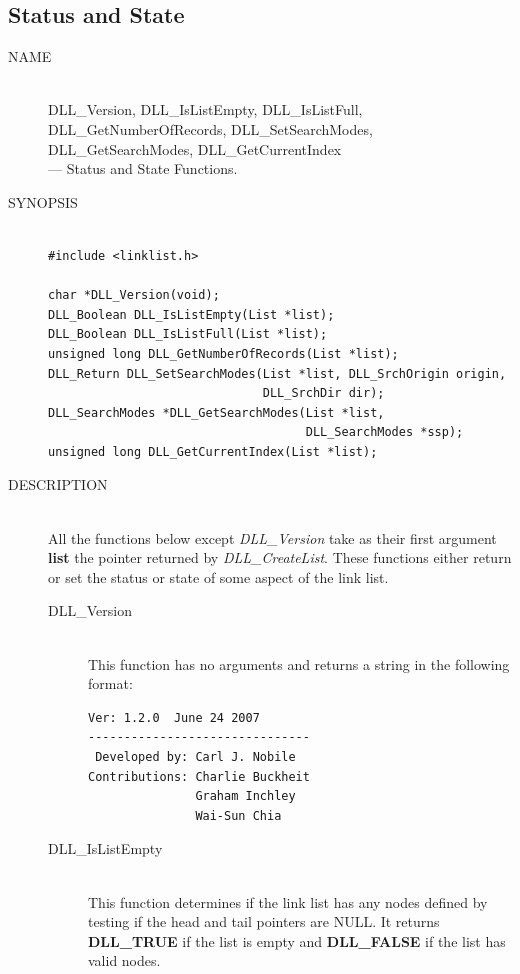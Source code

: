 \documentclass[10pt,letterpaper,titlepage]{article}
\begin{document}
\subsection{Status and State}
\begin{description}
\item[NAME]\quad\\
DLL\_Version, DLL\_IsListEmpty, DLL\_IsListFull,\\
DLL\_GetNumberOfRecords, DLL\_SetSearchModes,\\
DLL\_GetSearchModes, DLL\_GetCurrentIndex\\
 --- Status and State Functions.

\item[SYNOPSIS]
\small
\begin{verbatim}

#include <linklist.h>

char *DLL_Version(void);
DLL_Boolean DLL_IsListEmpty(List *list);
DLL_Boolean DLL_IsListFull(List *list);
unsigned long DLL_GetNumberOfRecords(List *list);
DLL_Return DLL_SetSearchModes(List *list, DLL_SrchOrigin origin,
                              DLL_SrchDir dir);
DLL_SearchModes *DLL_GetSearchModes(List *list,
                                    DLL_SearchModes *ssp);
unsigned long DLL_GetCurrentIndex(List *list);
\end{verbatim}
\normalsize

\item[DESCRIPTION]\quad\\
All the functions below except \emph{DLL\_Version} take as their first argument \textbf{list} the pointer returned by \emph{DLL\_CreateList}.  These functions either return or set the status or state of some aspect of the link list.

 \begin{description}
 \item[DLL\_Version]\quad\\
 This function has no arguments and returns a string in the following format:
 \begin{verbatim}
Ver: 1.2.0  June 24 2007
-------------------------------
 Developed by: Carl J. Nobile
Contributions: Charlie Buckheit
               Graham Inchley
               Wai-Sun Chia
 \end{verbatim}
 \vspace{-16pt}
 \item[DLL\_IsListEmpty]\quad\\
 This function determines if the link list has any nodes defined by testing if the head and tail pointers are NULL.  It returns \textbf{DLL\_TRUE} if the list is empty and \textbf{DLL\_FALSE} if the list has valid nodes.


\end{description}
\end{description}
\end{document}
